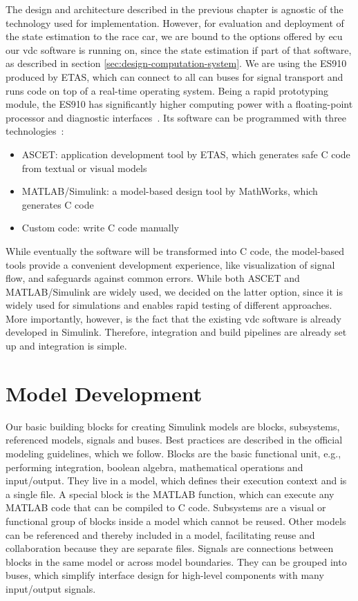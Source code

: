 The design and architecture described in the previous chapter is agnostic of the technology used for implementation. However, for evaluation and deployment of the state estimation to the race car, we are bound to the options offered by \gls{ecu} our \gls{vdc} software is running on, since the state estimation if part of that software, as described in section \ref{sec:design-computation-system}. We are using the ES910 produced by ETAS, which can connect to all \gls{can} buses for signal transport and runs code on top of a real-time operating system. Being a rapid prototyping module, the ES910 has significantly higher computing power with a floating-point processor and diagnostic interfaces~\cite[p.~16]{ETASGmbHStuttgart.2018}. Its software can be programmed with three technologies~\cites[p.~17]{ETASGmbHStuttgart.2018}[p.~10]{ETASGmbHStuttgart.2019}:
\begin{itemize}
\item ASCET: application development tool by ETAS, which generates safe C code from textual or visual models
\item MATLAB/Simulink: a model-based design tool by MathWorks, which generates C code
\item Custom code: write C code manually
\end{itemize}
While eventually the software will be transformed into C code, the model-based tools provide a convenient development experience, like visualization of signal flow, and safeguards against common errors. While both ASCET and MATLAB/Simulink are widely used, we decided on the latter option, since it is widely used for simulations and enables rapid testing of different approaches. More importantly, however, is the fact that the existing \gls{vdc} software is already developed in Simulink. Therefore, integration and build pipelines are already set up and integration is simple.


\section{Model Development}
Our basic building blocks for creating Simulink models are blocks, subsystems, referenced models, signals and buses. Best practices are described in the official modeling guidelines\cite{TheMathWorksInc..2020}, which we follow. Blocks are the basic functional unit, e.g., performing integration, boolean algebra, mathematical operations and input/output. They live in a model, which defines their execution context and is a single file. A special block is the MATLAB function, which can execute any MATLAB code that can be compiled to C code. Subsystems are a visual or functional group of blocks inside a model which cannot be reused. Other models can be referenced and thereby included in a model, facilitating reuse and collaboration because they are separate files. Signals are connections between blocks in the same model or across model boundaries. They can be grouped into buses, which simplify interface design for high-level components with many input/output signals.

